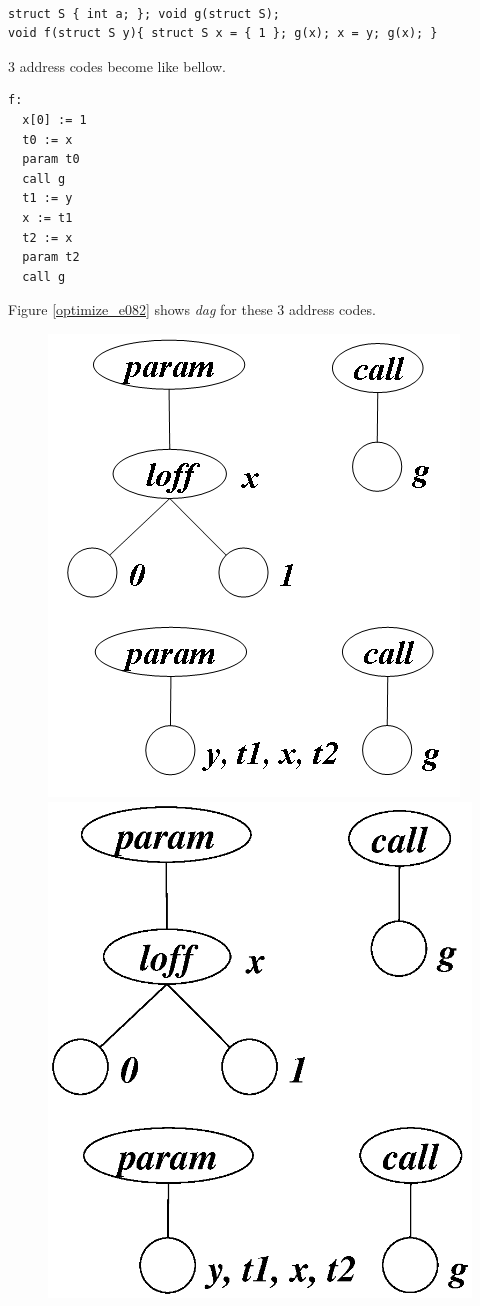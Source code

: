 \begin{Example}
\label{optimize_e081}
\begin{verbatim}

struct S { int a; }; void g(struct S);
void f(struct S y){ struct S x = { 1 }; g(x); x = y; g(x); }
\end{verbatim}
3 address codes become like bellow.
\begin{verbatim}
f:
  x[0] := 1
  t0 := x
  param t0
  call g
  t1 := y
  x := t1
  t2 := x
  param t2
  call g
\end{verbatim}
Figure \ref{optimize_e082} shows {\em dag} for these 3 address codes.
\begin{figure}[htbp]
\begin{center}
\begin{htmlonly}
\includegraphics[width=0.493\linewidth,height=0.6\linewidth]{opt034.png}
\end{htmlonly}
\begin{latexonly}
\includegraphics[width=0.493\linewidth,height=0.6\linewidth]{opt034.eps}
\end{latexonly}

\end{center}
\end{figure}
\end{Example}
